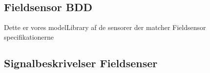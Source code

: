 
\subsection{Fieldsensor BDD}
Dette er vores modelLibrary af de sensorer der matcher Fieldsensor specifikationerne


\subsection{Signalbeskrivelser Fieldsenser}
